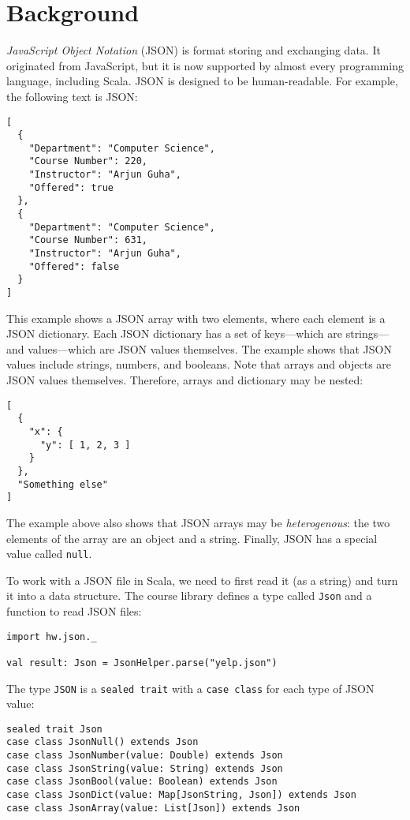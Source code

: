 \documentclass[9pt]{extbook}
\begin{document}
\section{Background}

\emph{JavaScript Object Notation} (JSON) is format storing and
exchanging data. It originated from JavaScript, but it is now supported by
almost every programming language, including Scala. JSON is designed
to be human-readable. For example, the following text is JSON:
%
\lstset{language=console}
\begin{lstlisting}
[
  {
    "Department": "Computer Science",
    "Course Number": 220,
    "Instructor": "Arjun Guha",
    "Offered": true
  },
  {
    "Department": "Computer Science",
    "Course Number": 631,
    "Instructor": "Arjun Guha",
    "Offered": false
  }
]
\end{lstlisting}
%
This example shows a JSON array with two elements, where each element is a
JSON dictionary. Each JSON dictionary has a set of keys---which are strings---and
values---which are JSON values themselves. The example shows that JSON values include
strings, numbers, and booleans. Note that arrays and objects are JSON values
themselves. Therefore, arrays and dictionary may be nested:
\lstset{language=console}
\begin{lstlisting}
[
  {
    "x": {
      "y": [ 1, 2, 3 ]
    }
  },
  "Something else"
]
\end{lstlisting}
%
The example above also shows that JSON arrays may be \emph{heterogenous}:
the two elements of the array are an object and a string.
Finally, JSON has a special value called \lstinline|null|.

\lstset{language=scala}
To work with a JSON file in Scala, we need to first read it (as a string)
and turn it into a data structure. The course library defines
a type called \lstinline|Json| and a function to read JSON files:
\begin{lstlisting}
import hw.json._

val result: Json = JsonHelper.parse("yelp.json")
\end{lstlisting}
%
The type \lstinline|JSON| is a \lstinline|sealed trait| with a
\lstinline|case class| for each type of JSON value:
\begin{lstlisting}
sealed trait Json
case class JsonNull() extends Json
case class JsonNumber(value: Double) extends Json
case class JsonString(value: String) extends Json
case class JsonBool(value: Boolean) extends Json
case class JsonDict(value: Map[JsonString, Json]) extends Json
case class JsonArray(value: List[Json]) extends Json
\end{lstlisting}
\end{document}
